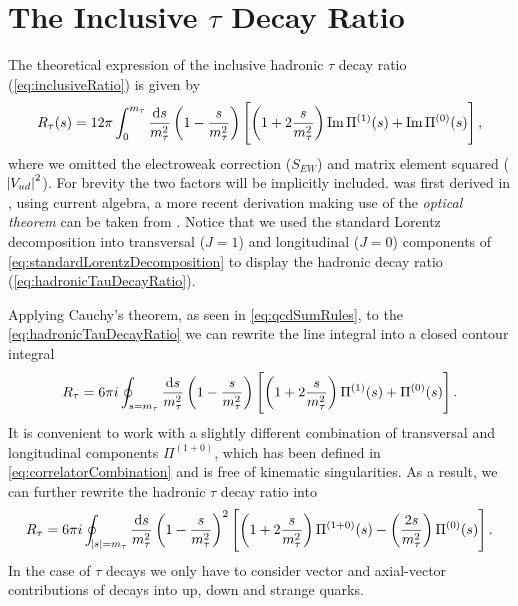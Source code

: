 \documentclass[../../index.tex]{subfiles}
\begin{document}
\section{The Inclusive \(\tau\) Decay Ratio}
The theoretical expression of the inclusive hadronic \(\tau\) decay ratio
(\cref{eq:inclusiveRatio}) is given by
\begin{equation}
  \label{eq:hadronicTauDecayRatio}
  R_\tau(s) = 12 \pi \int_0^{m_\tau} \frac{\dif s}{m_\tau^2}
  \left( 1 - \frac{s}{m_\tau^2} \right)
  \left[ \left( 1 + 2 \frac{s}{m_\tau^2} \right) \Ima \Pi^{(1)}(s) + \Ima \Pi^{(0)}(s) \right],
\end{equation}
where we omitted the electroweak correction (\(S_{EW}\)) and
 matrix element squared
(\(\abs{V_{ud}}^2\)). For brevity the two factors will be implicitly included.
 was first derived in \cite{Tsai1971}, using
current algebra, a more recent derivation making use of the \textit{optical
  theorem} can be taken from \cite{Schwab2002}. Notice that we used the standard
Lorentz decomposition into transversal (\(J=1\)) and longitudinal (\(J=0\))
components of \cref{eq:standardLorentzDecomposition} to display the hadronic
decay ratio (\cref{eq:hadronicTauDecayRatio}).

Applying Cauchy's theorem, as seen in \cref{eq:qcdSumRules}, to the
\cref{eq:hadronicTauDecayRatio} we can rewrite the line integral into a closed
contour integral
\begin{equation}
  \label{eq:rTauT+L}
  R_\tau = 6 \pi i \oint_{s=m_\tau} \frac{\dif s}{m_\tau^2}
  \left( 1 - \frac{s}{m_\tau^2} \right)
  \left[ \left( 1 + 2 \frac{s}{m_\tau^2} \right) \Pi^{(1)}(s) + \Pi^{(0)}(s) \right].
\end{equation}
It is convenient to work with a slightly different combination of transversal
and longitudinal components \(\Pi^{(1+0)}\), which has been defined in
\cref{eq:correlatorCombination} and is free of kinematic singularities. As a
result, we can further rewrite the hadronic \(\tau\) decay ratio into
\begin{equation}
  \label{eq:tauDecayRatioTL}
  R_\tau = 6 \pi i \oint_{\abs{s}=m_\tau} \frac{\dif s}{m_\tau^2}
  \left( 1 - \frac{s}{m_\tau^2} \right)^2
  \left[ \left( 1 + 2 \frac{s}{m_\tau^2} \right) \Pi^{(1+0)}(s) - \left( \frac{2 s}{m_\tau^2} \right) \Pi^{(0)}(s) \right].
\end{equation}
In the case of \(\tau\) decays we only have to consider vector and axial-vector
contributions of decays into up, down and strange quarks.
\end{document}
